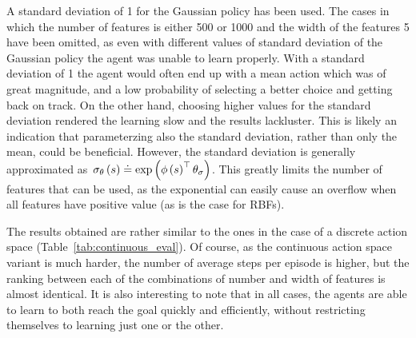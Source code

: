 A standard deviation of 1 for the Gaussian policy has been used. The cases in which the number of features is either 500 or 1000 and the width of the features 5 have been omitted, as even with different values of standard deviation of the Gaussian policy the agent was unable to learn properly. With a standard deviation of 1 the agent would often end up with a mean action which was of great magnitude, and a low probability of selecting a better choice and getting back on track. On the other hand, choosing higher values for the standard deviation rendered the learning slow and the results lackluster. This is likely an indication that parameterzing also the standard deviation, rather than only the mean, could be beneficial. However, the standard deviation is generally approximated as~${\sigma_{\policyparameter}\left(s\right)\doteq\exp\left(\featurevector\left(\state\right)^{\top}\policyparameter_{\sigma}\right)}$. This greatly limits the number of features that can be used, as the exponential can easily cause an overflow when all features have positive value (as is the case for RBFs).

The results obtained are rather similar to the ones in the case of a discrete action space (Table~\ref{tab:continuous_eval}). Of course, as the continuous action space variant is much harder, the number of average steps per episode is higher, but the ranking between each of the combinations of number and width of features is almost identical. It is also interesting to note that in all cases, the agents are able to learn to both reach the goal quickly and efficiently, without restricting themselves to learning just one or the other.
